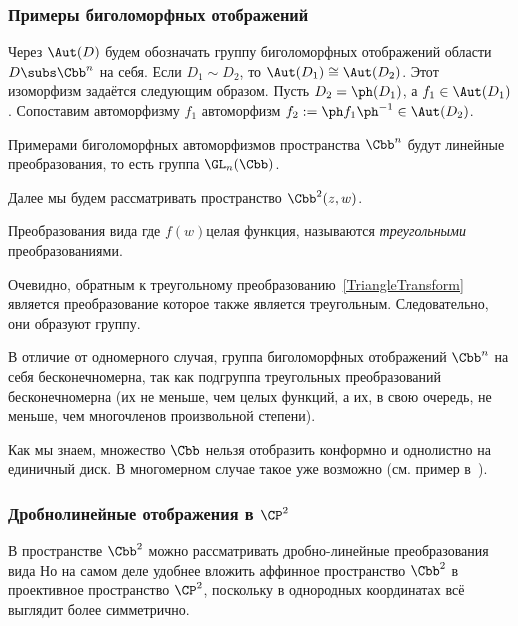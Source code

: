 \documentclass[a4paper]{article}
\begin{document}
\subsubsection{Примеры биголоморфных отображений}

Через $\Aut(D)$ будем обозначать группу биголоморфных отображений области $D \subs \Cbb^n$ на себя.
Если $D_1 \sim D_2$, то $\Aut(D_1) \cong \Aut(D_2)$. Этот изоморфизм задаётся следующим образом.
Пусть $D_2 = \ph(D_1)$, а $f_1 \in \Aut(D_1)$. Сопоставим автоморфизму $f_1$ автоморфизм
$f_2 := \ph f_1 \ph^{-1} \in \Aut(D_2)$.

Примерами биголоморфных автоморфизмов пространства $\Cbb^n$ будут линейные преобразования,
то есть группа $\GL_n(\Cbb)$.

Далее мы будем рассматривать пространство $\Cbb^2(z,w)$.

\begin{df}
Преобразования вида
где $f(w)$\т целая функция, называются \emph{треугольными} преобразованиями.
\end{df}

Очевидно, обратным к треугольному преобразованию~\eqref{TriangleTransform} является преобразование
которое также является треугольным. Следовательно, они образуют группу.

\begin{note}
В отличие от одномерного случая, группа биголоморфных отображений $\Cbb^n$ на себя бесконечномерна,
так как подгруппа треугольных преобразований бесконечномерна (их не меньше, чем целых функций, а их, в
свою очередь, не меньше, чем многочленов произвольной степени).
\end{note}

Как мы знаем, множество $\Cbb$ нельзя отобразить конформно и однолистно на единичный диск. В многомерном
случае такое уже возможно (см. пример в~\cite{shabat}).

\subsubsection{Дробно\д линейные отображения в $\CP^2$}

В пространстве $\Cbb^2$ можно рассматривать дробно-линейные преобразования вида
Но на самом деле удобнее вложить аффинное пространство $\Cbb^2$ в проективное пространство $\CP^2$,
поскольку в однородных координатах всё выглядит более симметрично.
\end{document}
